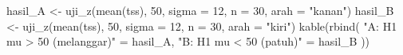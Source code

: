 \documentclass[
  indonesian,
  letterpaper,
]{book}
\newenvironment{Shaded}{\begin{snugshade}}{\end{snugshade}}
\newcommand{\AttributeTok}[1]{\textcolor[rgb]{0.40,0.45,0.13}{#1}}
\newcommand{\DecValTok}[1]{\textcolor[rgb]{0.68,0.00,0.00}{#1}}
\newcommand{\FunctionTok}[1]{\textcolor[rgb]{0.28,0.35,0.67}{#1}}
\newcommand{\NormalTok}[1]{\textcolor[rgb]{0.00,0.23,0.31}{#1}}
\newcommand{\OtherTok}[1]{\textcolor[rgb]{0.00,0.23,0.31}{#1}}
\newcommand{\StringTok}[1]{\textcolor[rgb]{0.13,0.47,0.30}{#1}}
\begin{document}
\begin{Shaded}
\begin{Highlighting}[]
\NormalTok{hasil\_A }\OtherTok{\textless{}{-}} \FunctionTok{uji\_z}\NormalTok{(}\FunctionTok{mean}\NormalTok{(tss), }\DecValTok{50}\NormalTok{, }\AttributeTok{sigma =} \DecValTok{12}\NormalTok{, }\AttributeTok{n =} \DecValTok{30}\NormalTok{, }\AttributeTok{arah =} \StringTok{"kanan"}\NormalTok{)}
\NormalTok{hasil\_B }\OtherTok{\textless{}{-}} \FunctionTok{uji\_z}\NormalTok{(}\FunctionTok{mean}\NormalTok{(tss), }\DecValTok{50}\NormalTok{, }\AttributeTok{sigma =} \DecValTok{12}\NormalTok{, }\AttributeTok{n =} \DecValTok{30}\NormalTok{, }\AttributeTok{arah =} \StringTok{"kiri"}\NormalTok{)}
\FunctionTok{kable}\NormalTok{(}\FunctionTok{rbind}\NormalTok{(}
  \StringTok{"A: H1 mu \textgreater{} 50 (melanggar)"} \OtherTok{=}\NormalTok{ hasil\_A,}
  \StringTok{"B: H1 mu \textless{} 50 (patuh)"}     \OtherTok{=}\NormalTok{ hasil\_B}
\NormalTok{))}
\end{Highlighting}
\end{Shaded}
\end{document}
